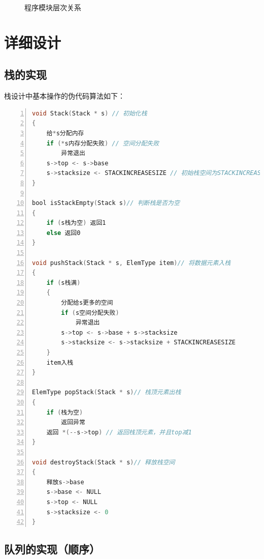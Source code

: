 \documentclass{article}
\begin{document}
\begin{figure}[htbp]
    
    
    \caption{程序模块层次关系}
    
\end{figure}

\section{详细设计}

\subsection{栈的实现}

栈设计中基本操作的伪代码算法如下：
\begin{lstlisting}[language={C},
    numbers=left,
    numberstyle=\tiny\consolas,
    basicstyle=\small\consolas]
void Stack(Stack * s) // 初始化栈
{    
    给*s分配内存
    if (*s内存分配失败) // 空间分配失败
        异常退出
    s->top <- s->base
    s->stacksize <- STACKINCREASESIZE // 初始栈空间为STACKINCREASESIZE
}

bool isStackEmpty(Stack s)// 判断栈是否为空
{
    if (s栈为空) 返回1
    else 返回0
}

void pushStack(Stack * s, ElemType item)// 将数据元素入栈
{
    if (s栈满) 
    {
        分配给s更多的空间
        if (s空间分配失败)
            异常退出
        s->top <- s->base + s->stacksize
        s->stacksize <- s->stacksize + STACKINCREASESIZE
    }
    item入栈
}

ElemType popStack(Stack * s)// 栈顶元素出栈
{
    if (栈为空)
        返回异常 
    返回 *(--s->top) // 返回栈顶元素，并且top减1
}

void destroyStack(Stack * s)// 释放栈空间
{
    释放s->base
    s->base <- NULL
    s->top <- NULL
    s->stacksize <- 0
}
\end{lstlisting}

\subsection{队列的实现（顺序）}
\end{document}
